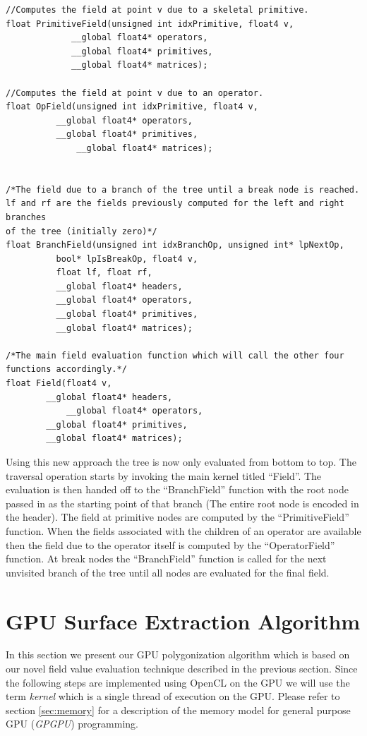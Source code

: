 \pagebreak
\begin{lstlisting}[frame=single]
//Computes the field at point v due to a skeletal primitive. 
float PrimitiveField(unsigned int idxPrimitive, float4 v,			
		     __global float4* operators,
		     __global float4* primitives, 
		     __global float4* matrices);

//Computes the field at point v due to an operator.
float OpField(unsigned int idxPrimitive, float4 v,			
	      __global float4* operators,
	      __global float4* primitives, 
              __global float4* matrices);


/*The field due to a branch of the tree until a break node is reached. 
lf and rf are the fields previously computed for the left and right branches 
of the tree (initially zero)*/
float BranchField(unsigned int idxBranchOp, unsigned int* lpNextOp, 
		  bool* lpIsBreakOp, float4 v, 
		  float lf, float rf,
		  __global float4* headers,
		  __global float4* operators,
		  __global float4* primitives, 
		  __global float4* matrices);
		  
/*The main field evaluation function which will call the other four functions accordingly.*/
float Field(float4 v,			
	    __global float4* headers,
            __global float4* operators,
	    __global float4* primitives, 
	    __global float4* matrices);
\end{lstlisting}

Using this new approach the tree is now only evaluated from bottom to top. 
The traversal operation starts by invoking the main kernel titled ``Field''. The evaluation is then handed off to the 
``BranchField'' function with the root node passed in as the starting point of that branch (The entire \blob root node 
is encoded in the header). The field at primitive nodes are computed by the ``PrimitiveField'' function. 
When the fields associated with the children of an operator are available then the field due to the operator 
itself is computed by the ``OperatorField'' function. At break nodes the ``BranchField'' function is called for the next
unvisited branch of the tree until all nodes are evaluated for the final field.


\section{GPU Surface Extraction Algorithm}
\label{sec:surfextraction}
In this section we present our GPU polygonization algorithm which is based on our novel field value evaluation technique described
in the previous section. Since the following steps are implemented using OpenCL on the GPU we will use the term \textit{kernel} which 
is a single thread of execution on the GPU. Please refer to section \ref{sec:memory} for a description of the memory model for
general purpose GPU (\textit{GPGPU}) programming.

